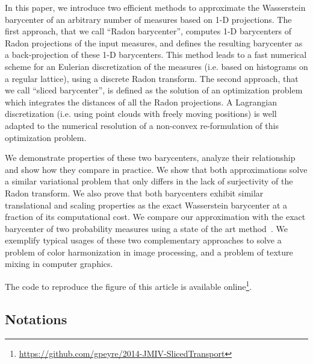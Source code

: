 In this paper, we introduce two efficient methods to approximate the Wasserstein barycenter of an arbitrary number of measures based on 1-D projections. The first approach, that we call ``Radon barycenter'', computes 1-D barycenters of Radon projections of the input measures, and defines the resulting barycenter as a back-projection of these 1-D barycenters. This method leads to a fast numerical scheme for an Eulerian discretization of the measures (i.e. based on histograms on a regular lattice), using a discrete Radon transform.  The second approach, that we call ``sliced barycenter'', is defined as the solution of an optimization problem which integrates the distances of all the Radon projections. A Lagrangian discretization (i.e. using point clouds with freely moving positions) is well adapted to the numerical resolution of a non-convex re-formulation of this optimization problem. 

We demonstrate properties of these two barycenters, analyze their relationship and show how they compare in practice. We show that both approximations solve a similar variational problem that only differs in the lack of surjectivity of the Radon transform. We also prove that both barycenters exhibit similar translational and scaling properties as the exact Wasserstein barycenter at a fraction of its computational cost. We compare our approximation with  the exact barycenter of two probability measures using a state of the art method~\cite{FPapPeyOud13}. We exemplify typical usages of these two complementary approaches to solve a problem of color harmonization in image processing, and a problem of texture mixing in computer graphics. 

The code to reproduce the figure of this article is available online\footnote{\url{https://github.com/gpeyre/2014-JMIV-SlicedTransport}}.


\subsection{Notations}

